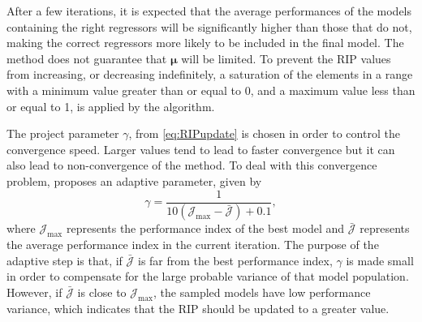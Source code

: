 
After a few iterations, it is expected that the average performances of the models containing the right regressors will be significantly higher than those that do not, making the correct regressors more likely to be included in the final model. The method does not guarantee that $ \bm{\mu}$ will be limited. To prevent the RIP values from increasing, or decreasing indefinitely, a saturation of the elements in a range with a minimum value greater than or equal to 0, and a maximum value less than or equal to 1, is applied by the algorithm.

The project parameter $\gamma$, from \eqref{eq:RIPupdate} is chosen in order to control the convergence speed. Larger values tend to lead to faster convergence but it can also lead to non-convergence of the method. To deal with this convergence problem, \cite{falsone2015} proposes an adaptive parameter, given by
\begin{equation}
   \gamma = \frac{1}{10(\mathcal{J}_{\max}- \bar{\mathcal{J}}) + 0.1}, 
\label{eq:gamma}
\end{equation}
where $\mathcal{J}_{\max}$ represents the performance index of the best model and $\bar{\mathcal{J}}$ represents the average performance index in the current iteration.
The purpose of the adaptive step is that, if $\bar{\mathcal{J}}$ is far from the best performance index, $\gamma$ is made small in order to compensate for the large probable variance of that model population. However, if $\bar{\mathcal{J}}$ is close to $\mathcal{J}_{\max}$, the sampled models have low performance variance, which indicates that the RIP should be updated to a greater value.

